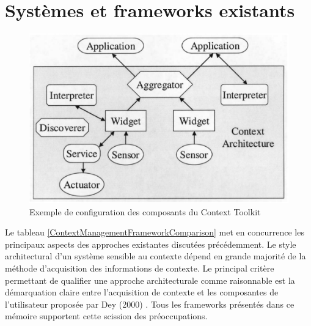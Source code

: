 \section{Systèmes et frameworks existants}

\begin{figure}
    \centerline{\includegraphics[width=.37\textwidth]{img/context_toolkit}}
    \caption{Exemple de configuration des composants du Context Toolkit}
    \label{Contexttoolkit}
\end{figure}

Le tableau \ref{ContextManagementFrameworkComparison} met en concurrence les
principaux aspects des approches existantes discutées précédemment. Le style
architectural d'un système sensible au contexte dépend en grande majorité de la
méthode d'acquisition des informations de contexte. Le principal critère
permettant de qualifier une approche architecturale comme raisonnable est la
démarquation claire entre l'acquisition de contexte et les composantes de
l'utilisateur proposée par Dey (2000) \cite{dey_providing_2000}. Tous les
frameworks présentés dans ce mémoire supportent cette scission des
préoccupations.

